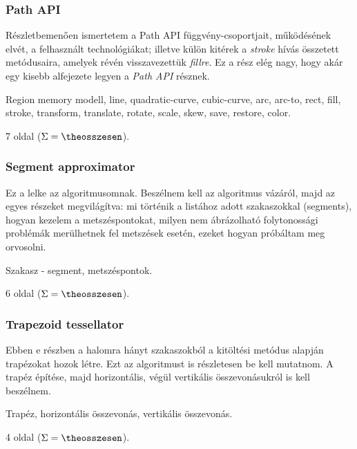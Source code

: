 \documentclass[12pt]{article}
\newcounter{osszesen}
\newcommand*{\oldalak}[1]{#1 oldal \setcounter{osszesen}{\theosszesen +
#1}($\Sigma=\theosszesen$)}
\begin{document}
  \subsubsection{Path API}
  Részletbemenően ismertetem a Path API függvény-csoportjait,
  működésének elvét, a felhasznált technológiákat; illetve külön
  kitérek a \emph{stroke} hívás összetett metódusaira, amelyek révén
  visszavezettük \emph{fillre}. Ez a rész elég nagy, hogy akár egy kisebb
  alfejezete legyen a \emph{Path API} résznek.

  \begin{description}[noitemsep]
    \item[Kulcsszavak] Region memory modell, line, quadratic-curve,
    cubic-curve, arc, arc-to, rect, fill, stroke, transform, translate, rotate,
    scale, skew, save, restore, color.
    \item[Becsült oldalszám] \oldalak{7}.
  \end{description}

  \subsubsection{Segment approximator}
  Ez a lelke az algoritmusomnak. Beszélnem kell az algoritmus vázáról, majd
  az egyes részeket megvilágítva: mi történik a listához adott
  szakaszokkal (segments), hogyan kezelem a metszéspontokat, milyen nem
  ábrázolható folytonossági problémák merülhetnek fel metszések
  esetén, ezeket hogyan próbáltam meg orvosolni.

  \begin{description}[noitemsep]
    \item[Kulcsszavak] Szakasz - segment, metszéspontok.
    \item[Becsült oldalszám] \oldalak{6}.
  \end{description}

  \subsubsection{Trapezoid tessellator}
  Ebben e részben a halomra hányt szakaszokból a kitöltési metódus
  alapján trapézokat hozok létre. Ezt az algoritmust is részletesen be kell
  mutatnom. A trapéz építése, majd horizontális, végül vertikális
  összevonásukról is kell beszélnem.

  \begin{description}[noitemsep]
    \item[Kulcsszavak] Trapéz, horizontális összevonás, vertikális összevonás.
    \item[Becsült oldalszám] \oldalak{4}.
  \end{description}
\end{document}
